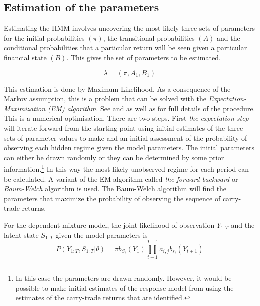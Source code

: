 \documentclass[12pt, a4paper, oneside]{article}\usepackage[]{graphicx}\usepackage[]{color}
\begin{document}
 
\subsection{Estimation of the parameters}
Estimating the HMM involves uncovering the most likely three sets of parameters for the initial probabilities $(\pi)$, the transitional probabilities $(A)$ and the conditional probabilities that a particular return will be seen given a particular financial state $(B)$.  This gives the set of parameters to be estimated. 

\begin{equation}
\lambda = (\pi, A_1, B_1)
\end{equation}

This estimation is done by Maximum Likelihood. As a consequence of the Markov assumption, this is a problem that can be solved with the \emph{Expectation-Maximization (EM) algorithm}.  See \citet{dempster1977maximum} and \citet{Hamilton1989} as well as \citet{depmixS4} for full details of the procedure.  This is a numerical optimisation.  There are two steps. First \emph{the expectation step} will iterate forward from the starting point using initial estimates of the three sets of parameter values  to make and an initial assessment of the probability of observing each hidden regime given the model parameters.  The initial parameters can either be drawn randomly or they can be determined by some prior information.\footnote{In this case the parameters are drawn randomly.  However, it would be possible to make initial estimates of the response model from \citet{Hayward2013} using the estimates of the carry-trade returns that are identified.}  In this way the most likely unobserved regime for each period can be calculated. A variant of the EM algorithm called \emph{the forward-backward} or \emph{Baum-Welch} algorithm \citet{Baum1970} is used.   The Baum-Welch algorithm will find the parameters that maximize the probability of observing the sequence of carry-trade returns.  

For the dependent mixture model, the joint likelihood of observation $Y_{1:T}$ and the latent state $S_{1:T}$ given the model parameters is 
\begin{equation}
P(Y_{1:T}, S_{1:T}|\theta) = \pi b_{S_t}(Y_1)\prod_{t-1}^{T-1} a_{i,j}b_{s_t}(Y_{t+1})
\end{equation}
\end{document}
